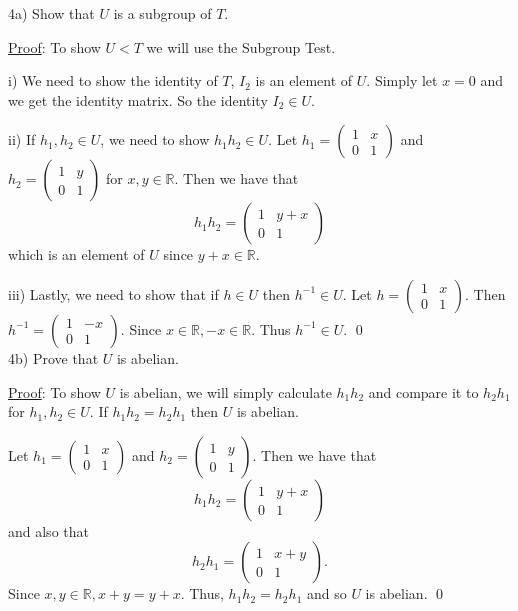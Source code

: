 \documentclass{article}
\begin{document}
4a) Show that $U$ is a subgroup of $T$.

\underline{Proof}: To show $U < T$ we will use the Subgroup Test.

i) We need to show the identity of $T$, $I_2$ is an element of $U$. Simply let $x = 0$ and we get the identity matrix. So the identity $I_2 \in U$.

ii) If $h_1, h_2 \in U$, we need to show $h_1h_2 \in U$. Let $h_1 =
\begin{pmatrix}
	1 & x \\ 
	0 & 1
\end{pmatrix}$ and $h_2 = 
\begin{pmatrix}
	1 & y \\ 
	0 & 1
\end{pmatrix}$ for $x, y \in \mathbb{R}$. Then we have that
$$h_1h_2 = 
\begin{pmatrix}
	1 & y + x \\
	0 & 1
\end{pmatrix}$$ which is an element of $U$ since $y + x \in \mathbb{R}$.

iii) Lastly, we need to show that if $h \in U$ then $h^{-1} \in U$. Let $h =
\begin{pmatrix}
	1 & x \\ 
	0 & 1
\end{pmatrix}.$ Then $h^{-1} =
\begin{pmatrix}
	1 & -x \\ 
	0 & 1
\end{pmatrix}.$ Since $x \in \mathbb{R}, -x \in \mathbb{R}$. Thus $h^{-1} \in U.$ \qed \\

4b) Prove that $U$ is abelian. 

\underline{Proof}: To show $U$ is abelian, we will simply calculate $h_1h_2$ and compare it to $h_2h_1$ for $h_1, h_2 \in U$. If $h_1h_2 = h_2h_1$ then $U$ is abelian.

Let $h_1 = 
\begin{pmatrix}
	1 & x \\ 
	0 & 1
\end{pmatrix}$ and 
$h_2 =
\begin{pmatrix}
	1 & y \\ 
	0 & 1
\end{pmatrix}$. Then we have that 
$$h_1h_2 = 
\begin{pmatrix}
	1 & y + x \\
	0 & 1		
\end{pmatrix}$$
and also that
$$h_2h_1 = 
\begin{pmatrix}
	1 & x + y \\
	0 & 1
\end{pmatrix}.$$ Since $x, y \in \mathbb{R}, x + y = y + x.$ Thus, $h_1h_2 = h_2h_1$ and so $U$ is abelian. \qed \\
\end{document}
